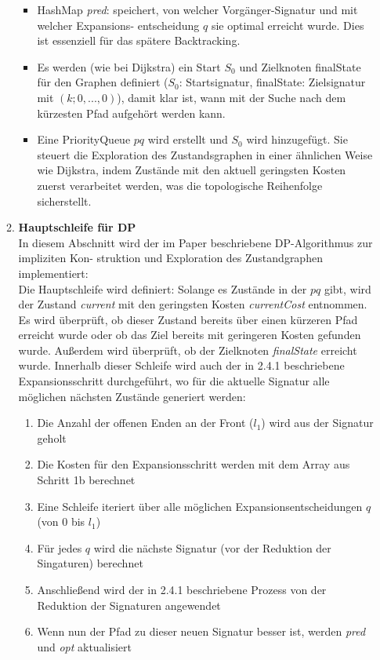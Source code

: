 \documentclass[a4paper,10pt,ngerman]{scrartcl}
\begin{document}
\begin{enumerate}
\begin{enumerate}
\begin{itemize}
      \item HashMap \textit{pred}: speichert, von welcher Vorgänger-Signatur und mit welcher Expansions- entscheidung $q$ sie optimal erreicht wurde. Dies ist essenziell für das spätere Backtracking. 
      \item Es werden (wie bei Dijkstra) ein Start $S_0$ und Zielknoten finalState für den Graphen definiert ($S_0$: Startsignatur, finalState: Zielsignatur mit $(k; 0, ..., 0)$), damit klar ist, wann mit der Suche nach dem kürzesten Pfad aufgehört werden kann. 
      \item Eine PriorityQueue $pq$ wird erstellt und $S_0$ wird hinzugefügt. Sie steuert die Exploration des Zustandsgraphen in einer ähnlichen Weise wie Dijkstra, indem Zustände mit den aktuell geringsten Kosten zuerst verarbeitet werden, was die topologische Reihenfolge sicherstellt. 
    \end{itemize}
  \item \textbf{Hauptschleife für DP}\\
  In diesem Abschnitt wird der im Paper beschriebene DP-Algorithmus zur impliziten Kon- struktion und Exploration des Zustandgraphen implementiert: \\
  \newline
  Die Hauptschleife wird definiert: Solange es Zustände in der $pq$ gibt, wird der Zustand \textit{current} mit den geringsten Kosten \textit{currentCost} entnommen. Es wird überprüft, ob dieser Zustand bereits über einen kürzeren Pfad erreicht wurde oder ob das Ziel bereits mit geringeren Kosten gefunden wurde. Außerdem wird überprüft, ob der Zielknoten \textit{finalState} erreicht wurde. 
  \newline
  Innerhalb dieser Schleife wird auch der in 2.4.1 beschriebene Expansionsschritt durchgeführt, wo für die aktuelle Signatur alle möglichen nächsten Zustände generiert werden:
  \begin{enumerate}
    \item Die Anzahl der offenen Enden an der Front ($l_1$) wird aus der Signatur geholt 
    \item Die Kosten für den Expansionsschritt werden mit dem Array aus Schritt 1b berechnet 
    \item Eine Schleife iteriert über alle möglichen Expansionsentscheidungen $q$ (von 0 bis $l_1$)
    \item Für jedes $q$ wird die nächste Signatur (vor der Reduktion der Singaturen) berechnet  
    \item Anschließend wird der in 2.4.1 beschriebene Prozess von der Reduktion der Signaturen angewendet 
    \item Wenn nun der Pfad zu dieser neuen Signatur besser ist, werden \textit{pred} und \textit{opt} aktualisiert  
  \end{enumerate}


\end{enumerate}
\end{enumerate}
\end{document}
